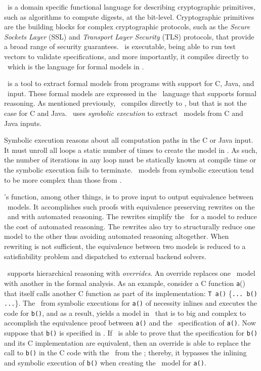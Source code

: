 \cryptol\ is a domain specific functional language for describing cryptographic primitives, such as algorithms to compute digests, at the bit-level.
Cryptographic primitives are the building blocks for complex cryptographic protocols, such as the \emph{Secure Sockets Layer} (SSL) and \emph{Transport Layer Security} (TLS) protocols, that provide a broad range of security guarantees.
\cryptol\ is executable, being able to run test vectors to validate specifications, and more importantly, it compiles directly to \sawcore\ which is the language for formal models in \saw.

\saw\ is a tool to extract formal models from programs with support for C, Java, and \cryptol\ input.
These formal models are expressed in the \sawcore\ language that supports formal reasoning.
As mentioned previously, \cryptol\ compiles directly to \sawcore, but that is not the case for C and Java.
\saw\ uses \emph{symbolic execution} to extract \sawcore\ models from C and Java inputs.

Symbolic execution reasons about all computation paths in the C or Java input.
It must unroll all loops a static number of times to create the model in \sawcore.
As such, the number of iterations in any loop must be statically known at compile time or the symbolic execution fails to terminate.
\sawcore\ models from symbolic execution tend to be more complex than those from \cryptol.

\saw's function, among other things, is to prove input to output equivalence between \sawcore\ models.
It accomplishes such proofs with equivalence preserving rewrites on the \sawcore\ and with automated reasoning.
The rewrites simplify the \sawcore\ for a model to reduce the cost of automated reasoning. 
The rewrites also try to structurally reduce one model to the other thus avoiding automated reasoning altogether.
When rewriting is not sufficient, the equivalence between two models is reduced to a satisfiability problem and dispatched to external backend solvers.

\saw\ supports hierarchical reasoning with \emph{overrides}.
An override replaces one \sawcore\ model with another in the formal analysis.
As an example, consider a C function \texttt{a}() that itself calls another C function as part of its implementation: \texttt{T a()} \{\texttt{... b() ...}\}.
The \sawcore\ from symbolic executions for \texttt{a()} of necessity inlines and executes the code for \texttt{b()}, and as a result, yields a model in \sawcore\ that is to big and complex to accomplish the equivalence proof between \texttt{a()} and the \cryptol\ specification of \texttt{a()}.
Now suppose that \texttt{b()} is specified in \cryptol.
If \saw\ is able to prove that the specification for \texttt{b()} and its C implementation are equivalent, then an override is able to replace the call to \texttt{b()} in the C code with the \sawcore\ from the \cryptol;
thereby, it bypasses the inlining and symbolic execution of \texttt{b()} when creating the \sawcore\ model for \texttt{a()}.

